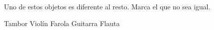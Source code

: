 \documentclass[12pt, letter, addpoints]{exam}
\begin{document}
\begin{questions}
    \question
    Uno de estos objetos es diferente al resto. 
    Marca el que no sea igual. 
    \begin{choices}
        \choice Tambor
        \choice Violín
        \CorrectChoice Farola
        \choice Guitarra
        \choice Flauta
    \end{choices}

\end{questions}
\end{document}
